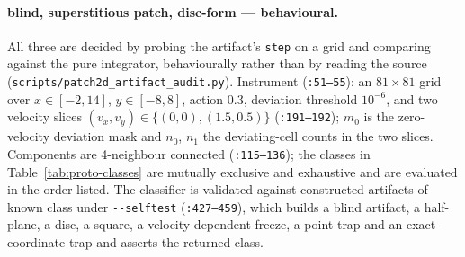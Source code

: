 \paragraph{blind, superstitious patch, disc-form --- behavioural.} All three are
decided by probing the artifact's \texttt{step} on a grid and comparing against
the pure integrator, behaviourally rather than by reading the source
(\texttt{scripts/\allowbreak patch2d\_\allowbreak artifact\_\allowbreak audit.\allowbreak py}). Instrument (\texttt{:51--55}):
an $81 \times 81$ grid over $x \in [-2, 14]$, $y \in [-8, 8]$, action $0.3$,
deviation threshold $10^{-6}$, and two velocity slices
$(v_x, v_y) \in \{(0,0), (1.5, 0.5)\}$ (\texttt{:191--192}); $m_0$ is the
zero-velocity deviation mask and $n_0$, $n_1$ the deviating-cell counts in the
two slices. Components are 4-neighbour connected (\texttt{:115--136}); the
classes in Table~\ref{tab:proto-classes} are mutually exclusive and exhaustive
and are evaluated in the order listed. The classifier is validated against
constructed artifacts of known class under \texttt{-{}-selftest}
(\texttt{:427--459}), which builds a blind artifact, a half-plane, a disc, a
square, a velocity-dependent freeze, a point trap and an exact-coordinate trap
and asserts the returned class.

